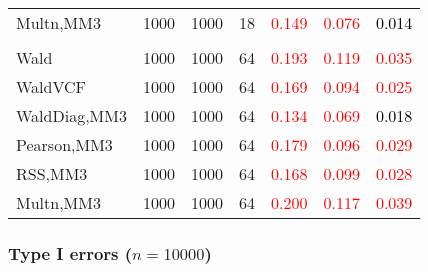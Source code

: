 \documentclass[
]{article}
\begin{document}
\begin{table}[H]
{\begin{tabular}[t]{lrrrrrr}
\hspace{1em}Multn,MM3 & 1000 & 1000 & 18 & \textcolor{red}{0.149} & \textcolor{red}{0.076} & \textcolor{black}{0.014}\\
\addlinespace[0.3em]
\multicolumn{7}{l}{\textbf{3F 15V}}\\
\hspace{1em}Wald & 1000 & 1000 & 64 & \textcolor{red}{0.193} & \textcolor{red}{0.119} & \textcolor{red}{0.035}\\
\hspace{1em}WaldVCF & 1000 & 1000 & 64 & \textcolor{red}{0.169} & \textcolor{red}{0.094} & \textcolor{red}{0.025}\\
\hspace{1em}WaldDiag,MM3 & 1000 & 1000 & 64 & \textcolor{red}{0.134} & \textcolor{red}{0.069} & \textcolor{black}{0.018}\\
\hspace{1em}Pearson,MM3 & 1000 & 1000 & 64 & \textcolor{red}{0.179} & \textcolor{red}{0.096} & \textcolor{red}{0.029}\\
\hspace{1em}RSS,MM3 & 1000 & 1000 & 64 & \textcolor{red}{0.168} & \textcolor{red}{0.099} & \textcolor{red}{0.028}\\
\hspace{1em}Multn,MM3 & 1000 & 1000 & 64 & \textcolor{red}{0.200} & \textcolor{red}{0.117} & \textcolor{red}{0.039}\\
\bottomrule
\end{tabular}}
\endgroup{}
\end{table}

\hypertarget{type-i-errors-n10000-3}{%
\subsubsection{\texorpdfstring{Type I errors
(\(n=10000\))}{Type I errors (n=10000)}}\label{type-i-errors-n10000-3}}
\end{document}
